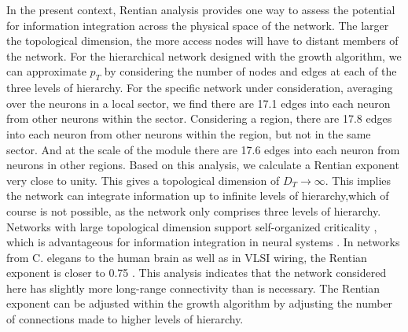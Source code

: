 \documentclass[twocolumn]{article}
\begin{document}
In the present context, Rentian analysis provides one way to assess the potential for information integration across the physical space of the network. The larger the topological dimension, the more access nodes will have to distant members of the network. For the hierarchical network designed with the growth algorithm, we can approximate $p_T$ by considering the number of nodes and edges at each of the three levels of hierarchy. For the specific network under consideration, averaging over the neurons in a local sector, we find there are 17.1 edges into each neuron from other neurons within the sector. Considering a region, there are 17.8 edges into each neuron from other neurons within the region, but not in the same sector. And at the scale of the module there are 17.6 edges into each neuron from neurons in other regions. Based on this analysis, we calculate a Rentian exponent very close to unity. This gives a topological dimension of $D_T \rightarrow \infty$. This implies the network can integrate information up to infinite levels of hierarchy,which of course is not possible, as the network only comprises three levels of hierarchy. Networks with large topological dimension support self-organized criticality \cite{be2007,rusp2011}, which is advantageous for information integration in neural systems \cite{be2007,kism2009,shya2009,ch2010,rusp2011}. In networks from C. elegans to the human brain as well as in VLSI wiring, the Rentian exponent is closer to 0.75 \cite{bagr2010}. This analysis indicates that the network considered here has slightly more long-range connectivity than is necessary. The Rentian exponent can be adjusted within the growth algorithm by adjusting the number of connections made to higher levels of hierarchy.  
	
\end{document}
